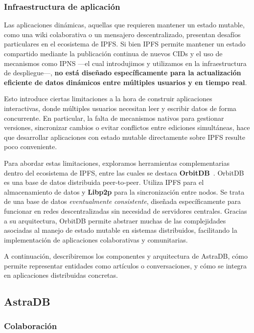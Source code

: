 \subsubsection{Infraestructura de aplicación}

Las aplicaciones dinámicas, aquellas que requieren mantener un estado mutable, como una wiki colaborativa o un mensajero descentralizado, presentan desafíos particulares en el ecosistema de IPFS. Si bien IPFS permite mantener un estado compartido mediante la publicación continua de nuevos CIDs y el uso de mecanismos como IPNS —el cual introdujimos y utilizamos en la infraestructura de despliegue—, \textbf{no está diseñado específicamente para la actualización eficiente de datos dinámicos entre múltiples usuarios y en tiempo real}.

Esto introduce ciertas limitaciones a la hora de construir aplicaciones interactivas, donde múltiples usuarios necesitan leer y escribir datos de forma concurrente. En particular, la falta de mecanismos nativos para gestionar versiones, sincronizar cambios o evitar conflictos entre ediciones simultáneas, hace que desarrollar aplicaciones con estado mutable directamente sobre IPFS resulte poco conveniente.

Para abordar estas limitaciones, exploramos herramientas complementarias dentro del ecosistema de IPFS, entre las cuales se destaca \textbf{OrbitDB}~\cite{orbitdb}. OrbitDB es una base de datos distribuida peer-to-peer. Utiliza IPFS para el almacenamiento de datos y \textbf{Libp2p}\cite{libp2p} para la sincronización entre nodos. Se trata de una base de datos \textit{eventualmente consistente}, diseñada específicamente para funcionar en redes descentralizadas sin necesidad de servidores centrales. Gracias a su arquitectura, OrbitDB permite abstraer muchas de las complejidades asociadas al manejo de estado mutable en sistemas distribuidos, facilitando la implementación de aplicaciones colaborativas y comunitarias.


A continuación, describiremos los componentes y arquitectura de AstraDB, cómo permite representar entidades como artículos o conversaciones, y cómo se integra en aplicaciones distribuidas concretas.

\subsection{AstraDB}



\subsubsection{Colaboración}

